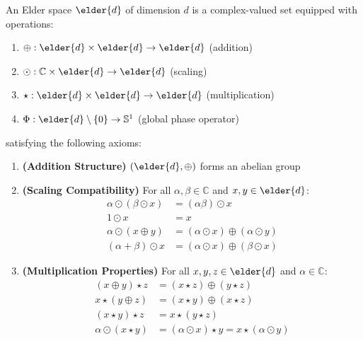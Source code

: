 \begin{definition}
\label{def:elder_space}
An Elder space $\elder{d}$ of dimension $d$ is a complex-valued set equipped with operations:
\begin{enumerate}
    \item $\oplus: \elder{d} \times \elder{d} \rightarrow \elder{d}$ (addition)
    \item $\odot: \mathbb{C} \times \elder{d} \rightarrow \elder{d}$ (scaling)
    \item $\star: \elder{d} \times \elder{d} \rightarrow \elder{d}$ (multiplication)
    \item $\Phi: \elder{d} \setminus \{0\} \rightarrow \mathbb{S}^1$ (global phase operator)
\end{enumerate}
satisfying the following axioms:
\begin{enumerate}[label=\textbf{A\arabic*}]
    \item \textbf{(Addition Structure)} $(\elder{d}, \oplus)$ forms an abelian group
    \item \textbf{(Scaling Compatibility)} For all $\alpha, \beta \in \mathbb{C}$ and $x, y \in \elder{d}$:
    \begin{align}
        \alpha \odot (\beta \odot x) &= (\alpha\beta) \odot x\\
        1 \odot x &= x\\
        \alpha \odot (x \oplus y) &= (\alpha \odot x) \oplus (\alpha \odot y)\\
        (\alpha + \beta) \odot x &= (\alpha \odot x) \oplus (\beta \odot x)
    \end{align}
    
    \item \textbf{(Multiplication Properties)} For all $x, y, z \in \elder{d}$ and $\alpha \in \mathbb{C}$:
    \begin{align}
        (x \oplus y) \star z &= (x \star z) \oplus (y \star z)\\
        x \star (y \oplus z) &= (x \star y) \oplus (x \star z)\\
        (x \star y) \star z &= x \star (y \star z)\\
        \alpha \odot (x \star y) &= (\alpha \odot x) \star y = x \star (\alpha \odot y)
    \end{align}
    

\end{enumerate}
\end{definition}
